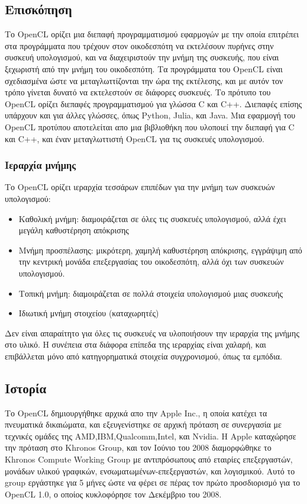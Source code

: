 \subsection{Επισκόπηση}
Το OpenCL ορίζει μια διεπαφή προγραμματισμού εφαρμογών με την οποία επιτρέπει στα προγράμματα που τρέχουν στον οικοδεσπότη να εκτελέσουν πυρήνες στην συσκευή υπολογισμού, και να διαχειριστούν την μνήμη της συσκευής, που είναι ξεχωριστή από την μνήμη του οικοδεσπότη. Τα προγράμματα του OpenCL είναι σχεδιασμένα ώστε να μεταγλωττίζονται την ώρα της εκτέλεσης, και με αυτόν τον τρόπο γίνεται δυνατό να εκτελεστούν σε διάφορες συσκευές. Το πρότυπο του OpenCL ορίζει διεπαφές προγραμματισμού για γλώσσα C και C++. Διεπαφές επίσης υπάρχουν και για άλλες γλώσσες, όπως Python, Julia, και Java. Μια εφαρμογή του OpenCL προτύπου αποτελείται απο μια βιβλιοθήκη που υλοποιεί την διεπαφή για C και C++, και έναν μεταγλωττιστή OpenCL για τις συσκευές υπολογισμού.\\
\subsubsection{Ιεραρχία μνήμης}
Το OpenCL ορίζει ιεραρχία τεσσάρων επιπέδων για την μνήμη των συσκευών υπολογισμού:
\begin{itemize}
\item Καθολική μνήμη: διαμοιράζεται σε όλες τις συσκευές υπολογισμού, αλλά έχει μεγάλη καθυστέρηση απόκρισης
\item Μνήμη προσπέλασης: μικρότερη, χαμηλή καθυστέρηση απόκρισης, εγγράψιμη από την κεντρική μονάδα επεξεργασίας του οικοδεσπότη, αλλά όχι των συσκευών υπολογισμού.
\item Τοπική μνήμη: διαμοιράζεται σε πολλά στοιχεία υπολογισμού μιας συσκευής
\item Ιδιωτική μνήμη στοιχείου (καταχωρητές) 
\end{itemize}   
Δεν είναι απαραίτητο για όλες τις συσκευές να υλοποιήσουν την ιεραρχία της μνήμης στο υλικό. Η συνέπεια στα διάφορα επίπεδα της ιεραρχίας είναι χαλαρή, και επιβάλλεται μόνο από κατηγορηματικά στοιχεία συγχρονισμού, όπως τα εμπόδια.
\subsection{Ιστορία}
Το OpenCL δημιουργήθηκε αρχικά απο την Apple Inc., η οποία κατέχει τα πνευματικά δικαιώματα, και εξευγενίστηκε σε αρχική πρόταση σε συνεργασία με τεχνικές ομάδες της AMD,IBM,Qualcomm,Intel, και Nvidia. Η Apple καταχώρησε την πρόταση στο Khronos Group, και τον Ιούνιο του 2008 διαμορφώθηκε το Khronos Compute Working Group με αντιπρόσωπους από εταιρίες επεξεργαστών, μονάδων υλικού γραφικών, ενσωματωμένων-επεξεργαστών, και λογισμικού. Αυτό το group εργάστηκε για 5 μήνες ώστε να φέρει σε πέρας τον πρώτο προσδιορισμό για το OpenCL 1.0, ο οποίος κυκλοφόρησε τον Δεκέμβριο του 2008. 
